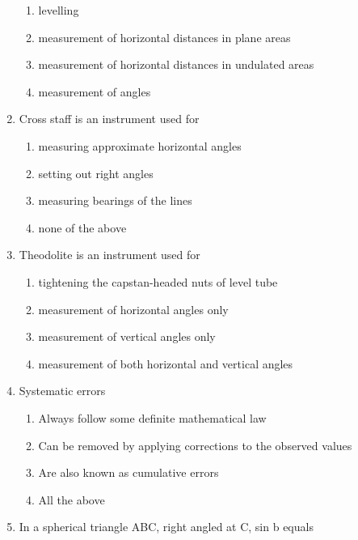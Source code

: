 \documentclass[11pt,a4paper]{article}
\begin{document}
\begin{enumerate}
\begin{enumerate}[label=\Alph*.]
\item{levelling}
\item{measurement of horizontal distances in plane areas}
\item{measurement of horizontal distances in undulated areas}
\item{measurement of angles}
\end{enumerate}
\item{Cross staff is an instrument used for}
\begin{enumerate}[label=\Alph*.]
\item{measuring approximate horizontal angles}
\item{setting out right angles}
\item{measuring bearings of the lines}
\item{none of the above}
\end{enumerate}
\item{Theodolite is an instrument used for}
\begin{enumerate}[label=\Alph*.]
\item{tightening the capstan-headed nuts of level tube}
\item{measurement of horizontal angles only}
\item{measurement of vertical angles only}
\item{measurement of both horizontal and vertical angles}
\end{enumerate}
\item{Systematic errors}
\begin{enumerate}[label=\Alph*.]
\item{Always follow some definite mathematical law}
\item{Can be removed by applying corrections to the observed values}
\item{Are also known as cumulative errors}
\item{All the above}
\end{enumerate}
\item{In a spherical triangle ABC, right angled at C, sin b equals}
\\

\end{enumerate}
\end{document}
